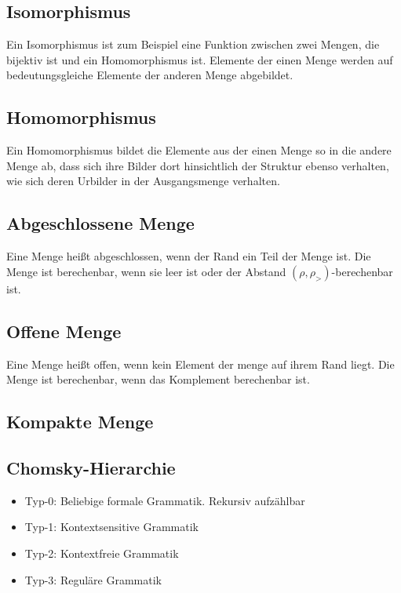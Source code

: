 \documentclass[ngerman]{scrartcl}
\begin{document}
\subsection{Isomorphismus}
Ein Isomorphismus ist zum Beispiel eine Funktion zwischen zwei Mengen, die bijektiv ist und ein Homomorphismus ist. Elemente der einen Menge werden auf bedeutungsgleiche Elemente der anderen Menge abgebildet.

\subsection{Homomorphismus}
Ein Homomorphismus bildet die Elemente aus der einen Menge so in die andere Menge ab, dass sich ihre Bilder dort hinsichtlich der Struktur ebenso verhalten, wie sich deren Urbilder in der Ausgangsmenge verhalten.

\subsection{Abgeschlossene Menge}
Eine Menge heißt abgeschlossen, wenn der Rand ein Teil der Menge ist. Die Menge ist berechenbar, wenn sie leer ist oder der Abstand $ (\rho, \rho_>) $-berechenbar ist.

\subsection{Offene Menge}
Eine Menge heißt offen, wenn kein Element der menge auf ihrem Rand liegt. Die Menge ist berechenbar, wenn das Komplement berechenbar ist.

\subsection{Kompakte Menge}

\subsection{Chomsky-Hierarchie}
\begin{itemize}
  \item Typ-0: Beliebige formale Grammatik. Rekursiv aufzählbar
  \item Typ-1: Kontextsensitive Grammatik
  \item Typ-2: Kontextfreie Grammatik
  \item Typ-3: Reguläre Grammatik
\end{itemize}




%
%
%
%
\end{document}
